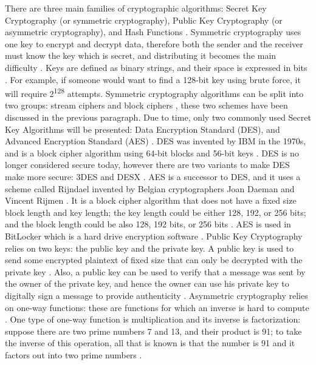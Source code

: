\documentclass{l4proj}
\begin{document}
There are three main families of cryptographic algorithms: Secret Key Cryptography (or symmetric cryptography), Public Key Cryptography (or asymmetric cryptography), and
Hash Functions \citep{kessler_overview_2016} \citep{savage_cse_2019}. Symmetric cryptography uses one key to encrypt and decrypt data, therefore both the sender and the 
receiver must know the key which is secret, and distributing it becomes the main difficulty \citep{kessler_overview_2016}. Keys are defined as binary strings, 
and their space is expressed in bits \citep{savage_cse_2019}. 
For example, if someone would want to find a 128-bit key using brute force, it will require 2\textsuperscript{128} attempts. 
Symmetric cryptography algorithms can be split into two groups: stream ciphers and block ciphers \citep{kessler_overview_2016}, 
these two schemes have been discussed in the previous paragraph. 
Due to time, only two commonly used Secret Key Algorithms will be presented: Data Encryption Standard (DES), and Advanced Encryption Standard (AES) \citep{kessler_overview_2016}. 
DES was invented by IBM in the 1970s, and is a block cipher algorithm using 64-bit blocks and 56-bit keys \citep{kessler_overview_2016}. 
DES is no longer considered secure today, however there are two variants to make DES make more secure: 3DES and DESX \citep{kessler_overview_2016}.
AES is a successor to DES, and it uses a scheme called Rijndael invented by Belgian cryptographers Joan Daeman and Vincent Rijmen \citep{kessler_overview_2016}.
It is a block cipher algorithm that does not have a fixed size block length and key length; the key length could be either 128, 192, or 256 bits;
and the block length could be also 128, 192 bits, or 256 bits \citep{kessler_overview_2016}. AES is used in BitLocker which is a hard drive encryption software \citep{noauthor_bitlocker_2019}.
Public Key Cryptography relies on two keys: the public key and the private key. 
A public key is used to send some encrypted plaintext of fixed size that can only be decrypted with the private key \citep{savage_cse_2019}. 
Also, a public key can be used to verify that a message was sent by the owner of the private key, 
and hence the owner can use his private key to digitally sign a message to provide authenticity \citep{savage_cse_2019}.
Asymmetric cryptography relies on one-way functions: these are functions for which an inverse is hard to compute \citep{kessler_overview_2016}.
One type of one-way function is multiplication and its inverse is factorization: suppose there are two prime numbers 7 and 13, and their product is 91; 
to take the inverse of this operation, all that is known is that the number is 91 and it factors out into two prime numbers \citep{kessler_overview_2016}.
\end{document}
